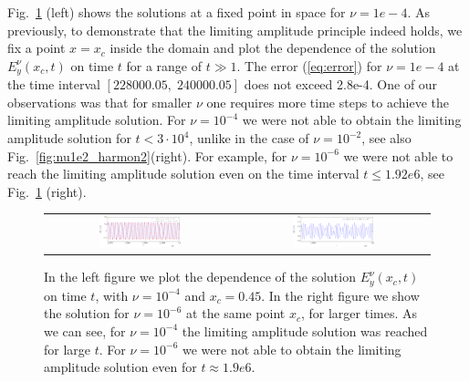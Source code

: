 Fig.~\ref{fig:nu1e4_harmon} (left) shows the solutions at a fixed point in space for $\nu=1e-4$. As previously, 
to demonstrate that the limiting amplitude principle indeed holds, we fix a point $x=x_c$ 
inside the domain and plot 
the dependence of the solution $E_{y}^{\nu}(x_c,t)$ on time $t$ for a range of $t\gg 1$. 
The error (\ref{eq:error}) for $\nu=1e-4$ at the time interval $[228000.05,\; 240000.05]$ does not exceed 2.8e-4. 
One of our observations was that for smaller $\nu$ one requires more time steps to achieve the limiting amplitude solution. 
For $\nu=10^{-4}$ we were not able to obtain the limiting amplitude solution for $t<3\cdot 10^{4}$, unlike in the case of $\nu=10^{-2}$, 
see also Fig.~\ref{fig:nu1e2_harmon2}(right). 
For example, for $\nu=10^{-6}$ we were not able to reach the limiting amplitude solution even on the time interval $t\leq 1.92e6$, 
see Fig.~\ref{fig:nu1e4_harmon} (right). 
\begin{figure}
\begin{tabular}{cc}
 \includegraphics[width=0.45\textwidth]{airy/figure_nu1e4-crop.pdf}&
 \includegraphics[width=0.45\textwidth]{airy/figure_nu1e6-crop.pdf}\\
\end{tabular}
\caption{In the left figure we plot the dependence of the solution $E_{y}^{\nu}(x_c,t)$ on time $t$, with $\nu=10^{-4}$ and $x_c=0.45$. 
In the right figure we show the solution for $\nu=10^{-6}$ at the same point $x_c$, for larger times. As we can see, for 
$\nu=10^{-4}$ the limiting amplitude solution was reached for large $t$. For $\nu=10^{-6}$ we were not able 
to obtain the limiting amplitude solution even for $t\approx 1.9e6$. }
  \label{fig:nu1e4_harmon}
\end{figure}


